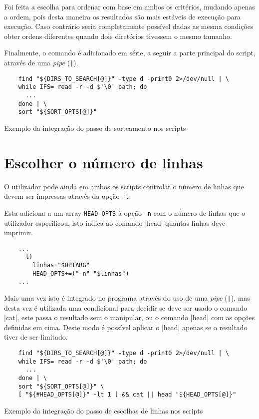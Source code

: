 Foi feita a escolha para ordenar com base em ambos os critérios, mudando apenas
a ordem, pois desta maneira os resultados são mais estáveis de execução para
execução. Caso contrário seria completamente possível dadas as mesma condições
obter ordens diferentes quando dois diretórios tivessem o mesmo tamanho.

Finalmente, o comando  é adicionado em série, a seguir a parte
principal do script, através de uma \emph{pipe} (\Verb_|_).

\begin{listing}[H]
	\centering
	\begin{verbatim}
    find "${DIRS_TO_SEARCH[@]}" -type d -print0 2>/dev/null | \
    while IFS= read -r -d $'\0' path; do
      ...
    done | \
    sort "${SORT_OPTS[@]}"
  \end{verbatim}
	\caption{Exemplo da integração do passo de sorteamento nos scripts}
\end{listing}

\section{Escolher o número de linhas}

O utilizador pode ainda em ambos os scripts controlar o número de linhas que
devem ser impressas através da opção \Verb|-l|.

Esta adiciona a um array \Verb|HEAD_OPTS| à opção \Verb|-n| com o número de
linhas que o utilizador especificou, isto indica ao comando \bashinline|head|
quantas linhas deve imprimir.

\begin{listing}[H]
	\centering
	\begin{verbatim}
    ...
      l)
        linhas="$OPTARG"
        HEAD_OPTS+=("-n" "$linhas")
    ...
  \end{verbatim}
	\cprotect\caption{Processamento da opção \Verb|-l|}
\end{listing}

Mais uma vez isto é integrado no programa através do uso de uma \emph{pipe}
(\Verb_|_), mas desta vez é utilizada uma condicional para decidir se deve ser
usado o comando \bashinline|cat|, este passa o resultado sem o manipular,
ou o comando \bashinline|head| com as opções definidas em cima. Deste modo é
possível aplicar o \bashinline|head| apenas se o resultado tiver de ser limitado.

\begin{listing}[H]
	\centering
	\begin{verbatim}
    find "${DIRS_TO_SEARCH[@]}" -type d -print0 2>/dev/null | \
    while IFS= read -r -d $'\0' path; do
      ...
    done | \
    sort "${SORT_OPTS[@]}" \
    [ "${#HEAD_OPTS[@]}" -lt 1 ] && cat || head "${HEAD_OPTS[@]}"
  \end{verbatim}
	\caption{Exemplo da integração do passo de escolhas de linhas nos scripts}
\end{listing}

